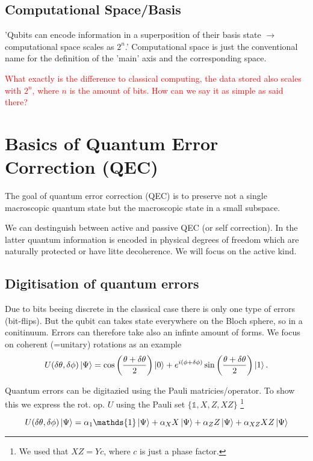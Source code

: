  
\subsection{Computational Space/Basis}
'Qubits can encode information in a superposition of their basis state $\rightarrow$ computational space scales as $2^n$.' \cite{QECintro}
Computational space is just the conventional name for the definition of the 'main' axis and the corresponding space.

\textcolor{red}{What exactly is the difference to classical computing, the data stored also scales with $2^n$, where $n$ is the amount of bits.
How can we say it as simple as said there?
}


\section{Basics of Quantum Error Correction (QEC)}
The goal of quantum error correction (QEC) is to preserve not a single macroscopic quantum state but the macroscopic state in a small subspace. \cite{QECmemory}

We can destinguish between active and passive QEC (or self correction).
In the latter quantum information is encoded in physical degrees of freedom which are naturally protected or have litte decoherence. \cite{QECmemory}
We will focus on the active kind.


\subsection{Digitisation of quantum errors}
Due to bits beeing discrete in the classical case there is only one type of errors (bit-flips). 
But the qubit can takes state everywhere on the Bloch sphere, so in a conitinuum. 
Errors can therefore take also an infinte amount of forms.
We focus on coherent (=unitary) rotations as an example
\begin{equation}
    U(\delta \theta, \delta \phi) \ket{\Psi}=
    \cos\left(\frac{\theta + \delta \theta}{2}\right) \ket{0} +
    e^{i(\phi + \delta \phi)} 
    \sin\left(\frac{\theta + \delta \theta}{2}\right) \ket{1}.
\end{equation} 

Quantum errors can be digitazied using the Pauli matricies/operator. 
To show this we express the rot. op. $U$ using the Pauli set
$\{\mathds{1},{X},{Z},{XZ}\}$
\footnote{We used that $XZ=Yc$, where $c$ is just a phase factor.}

\begin{equation}
    U(\delta \theta, \delta \phi)\ket{\Psi} = 
    \alpha_1 \mathds{1} \ket{\Psi} +
    \alpha_X X \ket{\Psi}+
    \alpha_Z Z \ket{\Psi}+
    \alpha_{XZ} XZ \ket{\Psi}
\end{equation}

